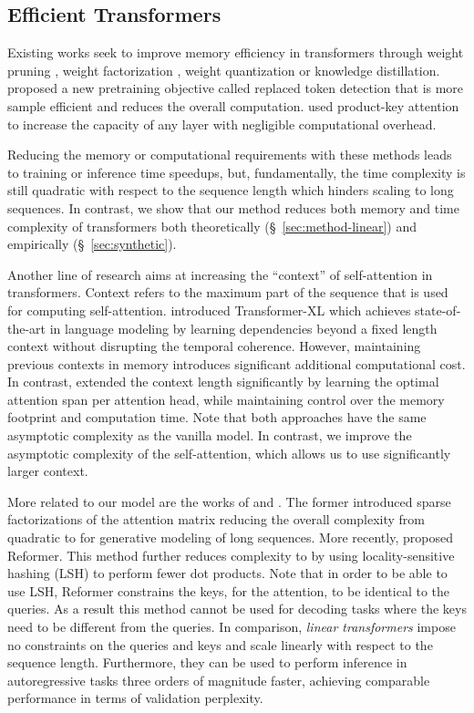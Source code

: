 \documentclass{article}
\newcommand{\linears}{\emph{linear transformers}}
\begin{document}
\subsection{Efficient Transformers}

Existing works seek to improve memory efficiency in transformers through weight
pruning \cite{paul19}, weight factorization \cite{Lan2020}, weight quantization
\cite{zafrir19} or knowledge distillation. \citet{clark2020electra} proposed a
new pretraining objective called replaced token detection that is more sample
efficient and reduces the overall computation. \citet{lample19} used
product-key attention to increase the capacity of any layer with negligible
computational overhead.

Reducing the memory or computational requirements with these methods leads to
training or inference time speedups, but, fundamentally, the time complexity is
still quadratic with respect to the sequence length which hinders scaling to
long sequences. In contrast, we show that our method reduces both memory
and time complexity of transformers both theoretically
(\S~\ref{sec:method-linear}) and empirically (\S~\ref{sec:synthetic}).

Another line of research aims at increasing the ``context'' of self-attention
in transformers. Context refers to the maximum part of the sequence that is
used for computing self-attention. \citet{dai-etal-2019-transformer} introduced
Transformer-XL which achieves state-of-the-art in language modeling by learning
dependencies beyond a fixed length context without disrupting the temporal
coherence. However, maintaining previous contexts in memory introduces
significant additional computational cost. In contrast,
\citet{sukhbaatar-etal-2019} extended the context length significantly by
learning the optimal attention span per attention head, while maintaining
control over the memory footprint and computation time. Note that both
approaches have the same asymptotic complexity as the vanilla model. In
contrast, we improve the asymptotic complexity of the self-attention, which
allows us to use significantly larger context.

More related to our model are the works of \citet{child2019generating} and
\citet{kitaev2020reformer}. The former \cite{child2019generating} introduced
sparse factorizations of the attention matrix reducing the overall complexity
from quadratic to  for generative modeling of long sequences.
More recently, \citet{kitaev2020reformer} proposed Reformer. This method
further reduces complexity to  by using locality-sensitive
hashing (LSH) to perform fewer dot products. Note that in order to be able to
use LSH, Reformer constrains the keys, for the attention, to be identical to
the queries. As a result this method cannot be used for decoding tasks where
the keys need to be different from the queries. In comparison, \linears{}
impose no constraints on the queries and keys and scale linearly
with respect to the sequence length. Furthermore, they can be used to perform
inference in autoregressive tasks three orders of magnitude faster, achieving
comparable performance in terms of validation perplexity.
\end{document}
